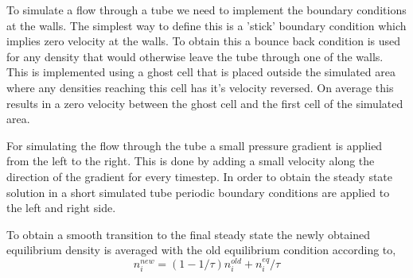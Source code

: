 \documentclass[8pt,twocolumn]{article}
\begin{document}
To simulate a flow through a tube we need to implement the boundary conditions at the walls. The simplest way to define this is a 'stick' boundary condition which implies zero velocity at the walls. To obtain this a bounce back condition is used for any density that would otherwise leave the tube through one of the walls. This is implemented using a ghost cell that is placed outside the simulated area where any densities reaching this cell has it's velocity reversed. On average this results in a zero velocity between the ghost cell and the first cell of the simulated area.

For simulating the flow through the tube a small pressure gradient is applied from the left to the right. This is done by adding a small velocity along the direction of the gradient for every timestep.
In order to obtain the steady state solution in a short simulated tube periodic boundary conditions are applied to the left and right side.  

To obtain a smooth transition to the final steady state the newly obtained equilibrium density is averaged with the old equilibrium condition according to,
\begin{equation}
n^{new}_i = \left(1 - 1/\tau\right) n^{old}_i + n^{eq}_i/\tau
\label{eq:equil}
\end{equation}
\end{document}
